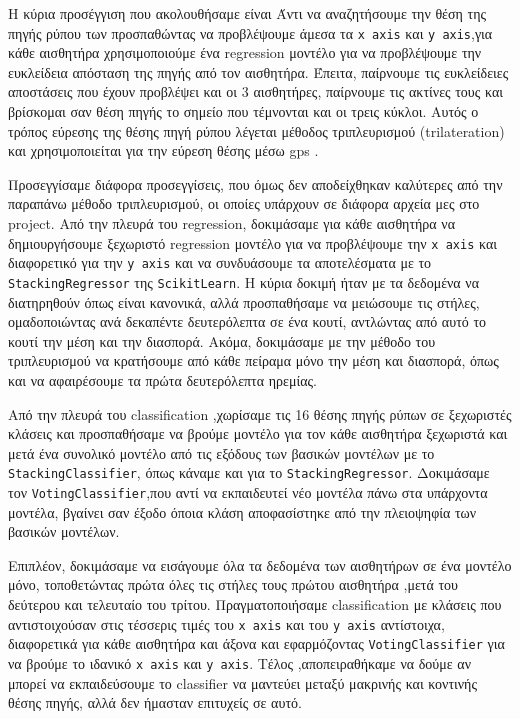 Η κύρια προσέγγιση που ακολουθήσαμε είναι Άντι να αναζητήσουμε την θέση της πηγής ρύπου των 
προσπαθώντας να προβλέψουμε άμεσα τα \texttt{x axis} και \texttt{y axis},για κάθε αισθητήρα χρησιμοποιούμε ένα regression μοντέλο
για να προβλέψουμε την ευκλείδεια απόσταση της πηγής από τον αισθητήρα.
Έπειτα, παίρνουμε τις ευκλείδειες αποστάσεις που έχουν προβλέψει και οι 3 αισθητήρες, παίρνουμε τις ακτίνες τους 
και βρίσκομαι σαν θέση πηγής το σημείο που τέμνονται και οι τρεις κύκλοι.
Αυτός ο τρόπος εύρεσης της θέσης πηγή ρύπου λέγεται μέθοδος τριπλευρισμού (trilateration) και χρησιμοποιείται
για την εύρεση θέσης μέσω gps \cite{trilateration}.

Προσεγγίσαμε διάφορα προσεγγίσεις, που όμως δεν αποδείχθηκαν καλύτερες από την παραπάνω μέθοδο τριπλευρισμού, οι οποίες υπάρχουν σε διάφορα αρχεία μες στο project.
Από την πλευρά του regression, δοκιμάσαμε για κάθε αισθητήρα να δημιουργήσουμε ξεχωριστό regression μοντέλο για να προβλέψουμε την \texttt{x axis} και διαφορετικό για την \texttt{y axis}
και να συνδυάσουμε τα αποτελέσματα με το \texttt{StackingRegressor} της \texttt{Scikit\-Learn}.
Η κύρια δοκιμή ήταν με τα δεδομένα να διατηρηθούν όπως είναι κανονικά, αλλά προσπαθήσαμε να μειώσουμε τις στήλες,
ομαδοποιώντας ανά δεκαπέντε δευτερόλεπτα σε ένα κουτί, αντλώντας από αυτό το κουτί την μέση και την διασπορά.
Ακόμα, δοκιμάσαμε με την μέθοδο του τριπλευρισμού να κρατήσουμε από κάθε πείραμα μόνο την μέση και διασπορά, όπως και να αφαιρέσουμε τα πρώτα δευτερόλεπτα ηρεμίας.

Από την πλευρά του classification ,χωρίσαμε τις 16 θέσης πηγής ρύπων σε ξεχωριστές κλάσεις και προσπαθήσαμε να βρούμε
μοντέλο για τον κάθε αισθητήρα ξεχωριστά και μετά ένα συνολικό μοντέλο από τις εξόδους των βασικών μοντέλων με το \texttt{StackingClassifier},
όπως κάναμε και για το \texttt{StackingRegressor}.
Δοκιμάσαμε τον \texttt{VotingClassifier},που αντί να εκπαιδευτεί νέο μοντέλα πάνω στα υπάρχοντα μοντέλα, βγαίνει σαν έξοδο όποια κλάση αποφασίστηκε 
από την πλειοψηφία των βασικών μοντέλων.

Επιπλέον, δοκιμάσαμε να εισάγουμε όλα τα δεδομένα των αισθητήρων σε ένα μοντέλο μόνο, τοποθετώντας πρώτα όλες τις στήλες τους πρώτου αισθητήρα ,μετά του δεύτερου
και τελευταίο του τρίτου.
Πραγματοποιήσαμε classification με κλάσεις που αντιστοιχούσαν στις τέσσερις τιμές του  \texttt{x axis}  και του \texttt{y axis} αντίστοιχα,
διαφορετικά για κάθε αισθητήρα και άξονα και εφαρμόζοντας \texttt{VotingClassifier} για να βρούμε το ιδανικό \texttt{x axis} και \texttt{y axis}.
Τέλος ,αποπειραθήκαμε να δούμε αν μπορεί να εκπαιδεύσουμε το classifier να μαντεύει μεταξύ μακρινής και κοντινής θέσης πηγής, αλλά δεν ήμασταν επιτυχείς σε αυτό.

